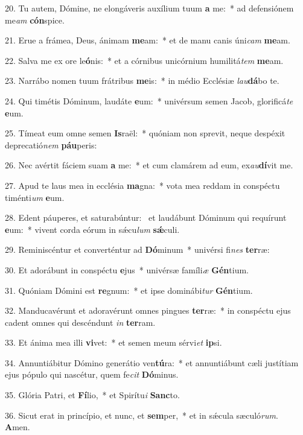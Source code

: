 20. Tu autem, Dómine, ne elongáveris auxílium tuum \textbf{a} me:~*  ad defensiónem me\textit{am} \textbf{cón}spice.\

21. Erue a frámea, Deus, ánimam \textbf{me}am:~*  et de manu canis úni\textit{cam} \textbf{me}am.\

22. Salva me ex ore le\textbf{ó}nis:~*  et a córnibus unicórnium humilitá\textit{tem} \textbf{me}am.\

23. Narrábo nomen tuum frátribus \textbf{me}is:~*  in médio Ecclésiæ \textit{lau}\textbf{dá}bo te.\

24. Qui timétis Dóminum, laudáte \textbf{e}um:~*  univérsum semen Jacob, glorificá\textit{te} \textbf{e}um.\

25. Tímeat eum omne semen \textbf{Is}raël:~*  quóniam non sprevit, neque despéxit deprecatió\textit{nem} \textbf{páu}peris:\

26. Nec avértit fáciem suam \textbf{a} me:~*  et cum clamárem ad eum, ex\textit{au}\textbf{dí}vit me.\

27. Apud te laus mea in ecclésia \textbf{ma}gna:~*  vota mea reddam in conspéctu timénti\textit{um} \textbf{e}um.\

28. Edent páuperes, et saturabúntur: \dag\  et laudábunt Dóminum qui requírunt \textbf{e}um:~*  vivent corda eórum in sǽcu\textit{lum} \textbf{sǽ}culi.\

29. Reminiscéntur et converténtur ad \textbf{Dó}minum~*  univérsi fi\textit{nes} \textbf{ter}ræ:\

30. Et adorábunt in conspéctu \textbf{e}jus~*  univérsæ famíli\textit{æ} \textbf{Gén}tium.\

31. Quóniam Dómini est \textbf{re}gnum:~*  et ipse dominábi\textit{tur} \textbf{Gén}tium.\

32. Manducavérunt et adoravérunt omnes pingues \textbf{ter}ræ:~*  in conspéctu ejus cadent omnes qui descéndunt \textit{in} \textbf{ter}ram.\

33. Et ánima mea illi \textbf{vi}vet:~*  et semen meum sérvi\textit{et} \textbf{ip}si.\

34. Annuntiábitur Dómino generátio ven\textbf{tú}ra:~*  et annuntiábunt cæli justítiam ejus pópulo qui nascétur, quem fe\textit{cit} \textbf{Dó}minus.\

35. Glória Patri, et \textbf{Fí}lio,~*  et Spirítu\textit{i} \textbf{Sanc}to.\

36. Sicut erat in princípio, et nunc, et \textbf{sem}per,~*  et in sǽcula sæculó\textit{rum}. \textbf{A}men.\

